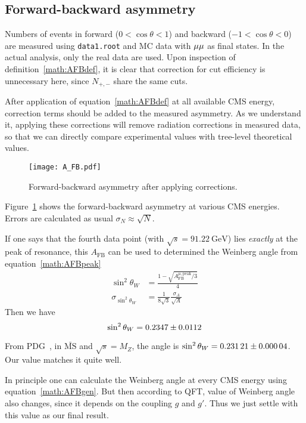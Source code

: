 \subsection{Forward-backward asymmetry}
Numbers of events in forward ($0 <\cos\theta<1$) and backward ($-1<\cos\theta<0$) are measured using \verb|data1.root| and MC data with $\mu\mu$ as final states. In the actual analysis, only the real data are used. Upon inspection of definition~\ref{math:AFBdef}, it is clear that correction for cut efficiency is unnecessary here, since $N_{+,-}$ share the same cuts.

After application of equation~\ref{math:AFBdef} at all available CMS energy, correction terms should be added to the measured asymmetry. As we understand it, applying these corrections will remove radiation corrections in measured data, so that we can directly compare experimental values with tree-level theoretical values.
\begin{figure}[ht]
	\centering
	\texttt{[image: A\_FB.pdf]}
	\caption{Forward-backward asymmetry after applying corrections. }%
	\label{fig:A_FB}
\end{figure}

Figure~\ref{fig:A_FB} shows the forward-backward asymmetry at various CMS energies. Errors are calculated as usual $\sigma_N \approx \sqrt{N}$.

If one says that the fourth data point (with $\sqrt{s} =\SI{91.22}{\giga\eV}$) lies \textit{exactly} at the peak of resonance, this $A_\text{FB}$ can be used to determined the Weinberg angle from equation~\ref{math:AFBpeak}
\begin{align*}
	\sin^2\theta_W &= \frac{1-\sqrt{A^{\mu, \text{peak}}_{\text{FB}}/3}}{4} \\
	\sigma_{\sin^2\theta_W} &= \frac{1}{8\sqrt{3}} \frac{\sigma_A}{\sqrt{A}}	
\end{align*}
Then we have
\begin{equation}
	\sin^2\theta_W = \num{0.2347 +- 0.0112}
\end{equation}

From PDG~\cite{PDG}, in $\bar{\text{MS}}$ and $\sqrt{s} = M_Z$, the angle is $\sin^2\theta_W = \num{0.23121 +- 0.00004}$. Our value matches it quite well.

In principle one can calculate the Weinberg angle at every CMS energy using equation~\ref{math:AFBgen}. But then according to QFT, value of Weinberg angle also changes, since it depends on the coupling $g$ and $g'$. Thus we just settle with this value as our final result.

